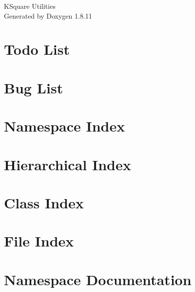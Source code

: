 \documentclass[twoside]{book}
\newcommand{\+}{\discretionary{\mbox{\scriptsize$\hookleftarrow$}}{}{}}
\newcommand{\clearemptydoublepage}{%
  \newpage{\pagestyle{empty}\cleardoublepage}%
}
\begin{document}
\hypersetup{pageanchor=false,
             bookmarksnumbered=true,
             pdfencoding=unicode
            }
\begin{titlepage}
\vspace*{7cm}
\begin{center}%
{\Large K\+Square Utilities }\\
\vspace*{1cm}
{\large Generated by Doxygen 1.8.11}\\
\end{center}
\end{titlepage}
\clearemptydoublepage
\tableofcontents
\clearemptydoublepage
{}
\hypersetup{pageanchor=true}

\chapter{Todo List}
\label{todo}
\hypertarget{todo}{}

\chapter{Bug List}
\label{bug}
\hypertarget{bug}{}

\chapter{Namespace Index}

\chapter{Hierarchical Index}

\chapter{Class Index}

\chapter{File Index}

\chapter{Namespace Documentation}







\end{document}

